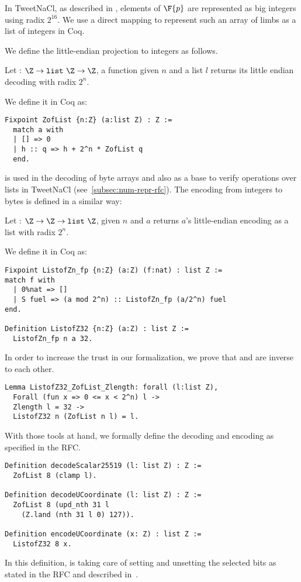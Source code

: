 In TweetNaCl, as described in ,
elements of $\F{p}$ are represented as big integers using radix $2^{16}$.
We use a direct mapping to represent such an array of limbs
as a list of integers in Coq.

We define the little-endian projection to integers as follows.
\begin{dfn}
Let  : $\Z \rightarrow \texttt{list}~\Z \rightarrow \Z$,
a function given $n$ and a list $l$ returns its little endian decoding with radix $2^n$.
\end{dfn}
We define it in Coq as:
\begin{lstlisting}[language=Coq]
Fixpoint ZofList {n:Z} (a:list Z) : Z :=
  match a with
  | [] => 0
  | h :: q => h + 2^n * ZofList q
  end.
\end{lstlisting}

 is used in the decoding of byte arrays and also as a
base to verify operations over lists in TweetNaCl (see~\ref{subsec:num-repr-rfc}).
The encoding from integers to bytes is defined in a similar way:
\begin{dfn}
Let  : $\Z \rightarrow \Z \rightarrow \texttt{list}~\Z$, given
$n$ and $a$ returns $a$'s little-endian encoding as a list with radix $2^n$.
\end{dfn}
We define it in Coq as:
\begin{lstlisting}[language=Coq]
Fixpoint ListofZn_fp {n:Z} (a:Z) (f:nat) : list Z :=
match f with
  | 0%nat => []
  | S fuel => (a mod 2^n) :: ListofZn_fp (a/2^n) fuel
end.

Definition ListofZ32 {n:Z} (a:Z) : list Z :=
  ListofZn_fp n a 32.
\end{lstlisting}
In order to increase the trust in our formalization, we prove that
 and  are inverse to each other.

\begin{lstlisting}[language=Coq]
Lemma ListofZ32_ZofList_Zlength: forall (l:list Z),
  Forall (fun x => 0 <= x < 2^n) l ->
  Zlength l = 32 ->
  ListofZ32 n (ZofList n l) = l.
\end{lstlisting}

With those tools at hand, we formally define the decoding and encoding as
specified in the RFC.

\begin{lstlisting}[language=Coq]
Definition decodeScalar25519 (l: list Z) : Z :=
  ZofList 8 (clamp l).

Definition decodeUCoordinate (l: list Z) : Z :=
  ZofList 8 (upd_nth 31 l
    (Z.land (nth 31 l 0) 127)).

Definition encodeUCoordinate (x: Z) : list Z :=
  ListofZ32 8 x.
\end{lstlisting}

In this definition,  is taking care of setting and unsetting the
selected bits as stated in the RFC and described in~.
